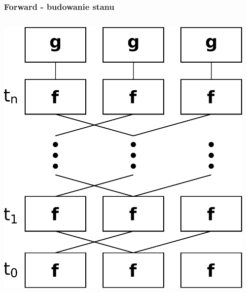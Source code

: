 \documentclass{beamer}
\begin{document}
\begin{frame}
\frametitle{Forward - budowanie stanu}
\begin{columns}
	\begin{column}{0.66\textwidth}
		\includegraphics[scale=0.4]{img/forward}
	\end{column}
	\begin{column}{0.34\textwidth}
	\end{column}
\end{columns}
\end{frame}
\end{document}

